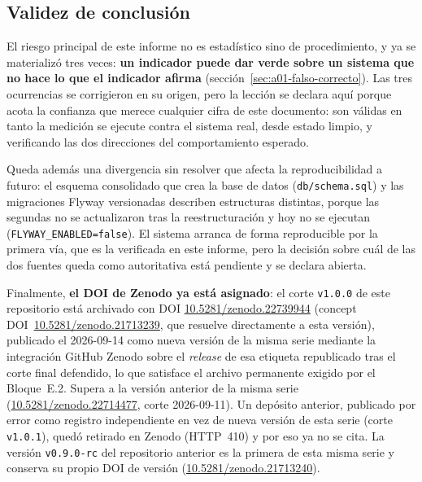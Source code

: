 \documentclass[11pt,a4paper]{article}
\newcommand{\ruta}[1]{\texttt{\footnotesize #1}}
\begin{document}
\subsection{Validez de conclusión}

El riesgo principal de este informe no es estadístico sino de
procedimiento, y ya se materializó tres veces: \textbf{un indicador puede
dar verde sobre un sistema que no hace lo que el indicador afirma}
(sección~\ref{sec:a01-falso-correcto}). Las tres ocurrencias se corrigieron
en su origen, pero la lección se declara aquí porque acota la confianza que
merece cualquier cifra de este documento: son válidas en tanto la medición
se ejecute contra el sistema real, desde estado limpio, y verificando las
dos direcciones del comportamiento esperado.

Queda además una divergencia sin resolver que afecta la reproducibilidad a
futuro: el esquema consolidado que crea la base de datos
(\ruta{db/schema.sql}) y las migraciones Flyway versionadas describen
estructuras distintas, porque las segundas no se actualizaron tras la
reestructuración y hoy no se ejecutan (\texttt{FLYWAY\_ENABLED=false}). El
sistema arranca de forma reproducible por la primera vía, que es la
verificada en este informe, pero la decisión sobre cuál de las dos fuentes
queda como autoritativa está pendiente y se declara abierta.

Finalmente, \textbf{el DOI de Zenodo ya está asignado}: el corte
\texttt{v1.0.0} de este repositorio está archivado con DOI
\href{https://doi.org/10.5281/zenodo.22739944}{10.5281/zenodo.22739944}
(concept DOI~\href{https://doi.org/10.5281/zenodo.21713239}{10.5281/zenodo.21713239},
que resuelve directamente a esta versión), publicado el 2026-09-14 como
nueva versión de la misma serie mediante la integración
GitHub\,\textrightarrow\,Zenodo sobre el \emph{release} de esa etiqueta
republicado tras el corte final defendido, lo que
satisface el archivo permanente exigido por el Bloque~E.2. Supera a la
versión anterior de la misma serie
(\href{https://doi.org/10.5281/zenodo.22714477}{10.5281/zenodo.22714477},
corte 2026-09-11). Un depósito anterior, publicado por error como
registro independiente en vez de nueva versión de esta serie
(corte \texttt{v1.0.1}), quedó retirado en Zenodo (HTTP~410) y por eso
ya no se cita. La
versión \texttt{v0.9.0-rc} del repositorio anterior es la primera de esta
misma serie y conserva su propio DOI de versión
(\href{https://doi.org/10.5281/zenodo.21713240}{10.5281/zenodo.21713240}).

\end{document}
